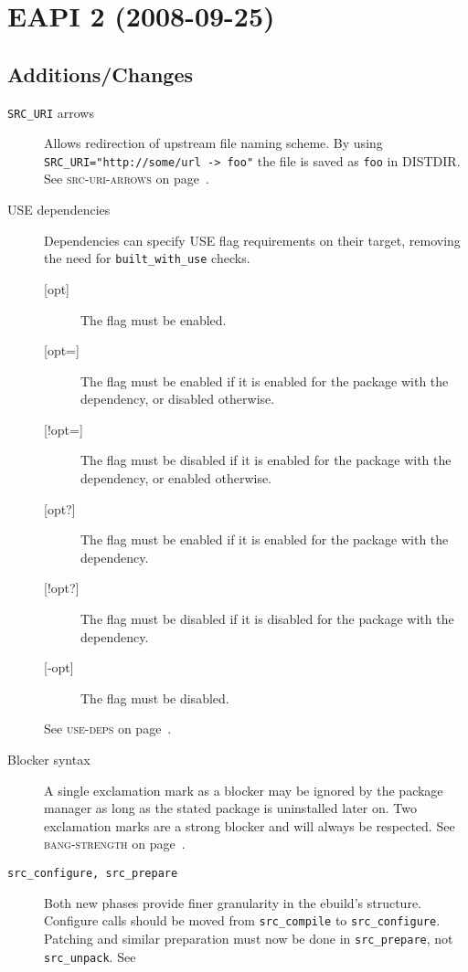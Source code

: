 \documentclass[a4paper]{leaflet}
\newcommand{\code}[1]{\texttt{#1}}
\newcommand{\featureref}[1]{\textsc{#1} on page~\pageref{feat:#1}}
\begin{document}
\section{EAPI 2 (2008-09-25)}
\label{sec:cs:eapi2}
\subsection{Additions/Changes}
\label{sec:cs:eapi2-additions}
\begin{description}
    \item[\code{SRC\_URI} arrows] Allows redirection of upstream file
    naming scheme.  By using
    \code{SRC\_URI="http:/\slash some\slash url -> foo"} the file is
    saved as \code{foo} in DISTDIR.
    See \featureref{src-uri-arrows}.
    \item[USE dependencies] Dependencies can specify USE flag
    requirements on their target, removing the need for
    \code{built\_with\_use} checks.
    \begin{description}
        \item[{[opt]}] The flag must be enabled.
        \item[{[opt=]}] The flag must be enabled if it is
        enabled for the package with the dependency, or disabled
        otherwise.
        \item[{[!opt=]}] The flag must be disabled if it is
        enabled for the package with the dependency, or enabled
        otherwise.
        \item[{[opt?]}] The flag must be enabled if it is
        enabled for the package with the dependency.
        \item[{[!opt?]}] The flag must be disabled if it is
        disabled for the package with the dependency.
        \item[{[-opt]}] The flag must be disabled.
    \end{description}
    See \featureref{use-deps}.
    \item[Blocker syntax] A single exclamation mark as a blocker may
    be ignored by the package manager as long as the stated package is
    uninstalled later on.  Two exclamation marks are a strong blocker
    and will always be respected.  See \featureref{bang-strength}.
    \item[\code{src\_configure, src\_prepare}] Both new phases provide
    finer granularity in the ebuild's structure.  Configure calls
    should be moved from \code{src\_compile} to \code{src\_configure}.
    Patching and similar preparation must now be done in
    \code{src\_prepare}, not \code{src\_unpack}.  See

\end{description}
\end{document}
